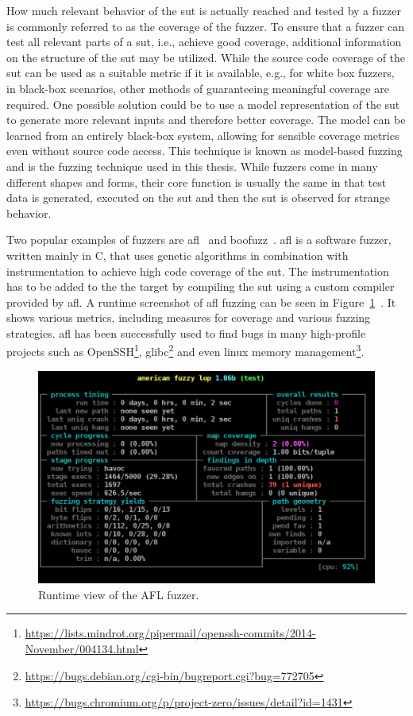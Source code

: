 How much relevant behavior of the \ac{sut} is actually reached and tested by a fuzzer is commonly referred to as the coverage of the fuzzer. To ensure that a fuzzer can test all relevant parts of a \ac{sut}, i.e., achieve good coverage, additional information on the structure of the \ac{sut} may be utilized. While the source code coverage of the \ac{sut} can be used as a suitable metric if it is available, e.g., for white box fuzzers, in black-box scenarios, other methods of guaranteeing meaningful coverage are required. One possible solution could be to use a model representation of the \ac{sut} to generate more relevant inputs and therefore better coverage. The model can be learned from an entirely black-box system, allowing for sensible coverage metrics even without source code access. This technique is known as model-based fuzzing and is the fuzzing technique used in this thesis. While fuzzers come in many different shapes and forms, their core function is usually the same in that test data is generated, executed on the \ac{sut} and then the \ac{sut} is observed for strange behavior.

Two popular examples of fuzzers are \ac{afl}~\cite{zalewskiafl} and boofuzz~\cite{pereyda2019boofuzz}. \ac{afl} is a software fuzzer, written mainly in C, that uses genetic algorithms in combination with instrumentation to achieve high code coverage of the \Ac{sut}. The instrumentation has to be added to the the target by compiling the \ac{sut} using a custom compiler provided by \ac{afl}. A runtime screenshot of \ac{afl} fuzzing can be seen in Figure~\ref{fig:americanfuzzylopsafl-fuzzrunningonatestprogram}~\cite{pict}. It shows various metrics, including measures for coverage and various fuzzing strategies. \ac{afl} has been successfully used to find bugs in many high-profile projects such as OpenSSH\footnote{\url{https://lists.mindrot.org/pipermail/openssh-commits/2014-November/004134.html}}, glibc\footnote{\url{https://bugs.debian.org/cgi-bin/bugreport.cgi?bug=772705}} and even linux memory management\footnote{\url{https://bugs.chromium.org/p/project-zero/issues/detail?id=1431}}. 

\begin{figure}
	\centering
	\includegraphics[width=0.9\linewidth]{images/American_fuzzy_lop's_afl-fuzz_running_on_a_test_program}
	\caption{Runtime view of the AFL fuzzer.}
	\label{fig:americanfuzzylopsafl-fuzzrunningonatestprogram}
\end{figure}

